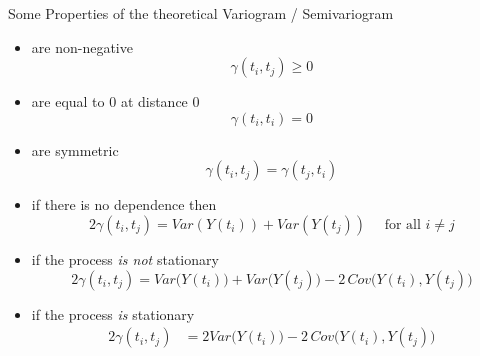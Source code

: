 \documentclass[11pt,ignorenonframetext,]{beamer}
\providecommand{\tightlist}{%
  \setlength{\itemsep}{0pt}\setlength{\parskip}{0pt}}
\begin{document}
\begin{frame}[t]{%
\protect\hypertarget{some-properties-of-the-theoretical-variogram-semivariogram}{%
Some Properties of the theoretical Variogram / Semivariogram}}

\begin{itemize}
\tightlist
\item
  are non-negative \footnotesize \[\gamma(t_i, t_j) \geq 0\] \normalsize
\end{itemize}

\pause

\vspace{2mm}

\begin{itemize}
\tightlist
\item
  are equal to 0 at distance 0 \footnotesize \[\gamma(t_i, t_i) = 0\]
  \normalsize
\end{itemize}

\pause

\vspace{2mm}

\begin{itemize}
\tightlist
\item
  are symmetric \footnotesize \[\gamma(t_i, t_j) = \gamma(t_j, t_i)\]
  \normalsize
\end{itemize}

\pause

\vspace{2mm}

\begin{itemize}
\tightlist
\item
  if there is no dependence then
  \footnotesize \[2\gamma(t_i, t_j) = Var(Y(t_i)) + Var(Y(t_j)) \quad \text{ for all } i \ne j\]
  \normalsize
\end{itemize}

\pause

\vspace{2mm}

\begin{itemize}
\tightlist
\item
  if the process \emph{is not} stationary \footnotesize
  \[2\gamma(t_i, t_j) = Var\big(Y(t_i)\big) + Var\big(Y(t_j)\big) - 2 \, Cov\big(Y(t_i),Y(t_j)\big)\]
\end{itemize}

\pause

\vspace{2mm}

\begin{itemize}
\tightlist
\item
  if the process \emph{is} stationary \footnotesize \[\begin{aligned}
  2\gamma(t_i, t_j) 
  &= 2Var\big(Y(t_i)\big) - 2 \, Cov\big(Y(t_i),Y(t_j)\big)
  \end{aligned}\]
\end{itemize}

\end{frame}
\end{document}
